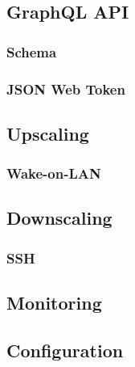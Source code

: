 \subsection{GraphQL API}
\label{subsec:implementation_server_graphql}

\subsubsection{Schema}
\label{subsubsec:implementation_server_graphql_schema}

\subsubsection{JSON Web Token}
\label{subsubsec:implementation_server_graphql_json_web_token}

\subsection{Upscaling}
\label{subsec:implementation_server_upscaling}

\subsubsection{Wake-on-LAN}
\label{subsubsec:implementation_server_scale_up_wake_on_lan}

\subsection{Downscaling}
\label{subsec:implementation_server_downscaling}

\subsubsection{SSH}
\label{subsubsec:implementation_server_scale_up_ssh}

\subsection{Monitoring}
\label{subsec:implementation_server_monitoring}


\subsection{Configuration}
\label{subsec:implementation_server_configuration}

